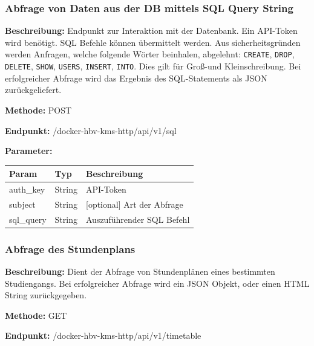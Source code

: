 \subsubsection{Abfrage von Daten aus der DB mittels SQL Query String}
\label{sec:api-sql-query}
\textbf{Beschreibung:} Endpunkt zur Interaktion mit der Datenbank. Ein API-Token wird benötigt. SQL Befehle können
übermittelt werden. Aus sicherheitsgründen werden Anfragen, welche folgende Wörter beinhalen, abgelehnt:
\verb|CREATE|, \verb|DROP|, \verb|DELETE|, \verb|SHOW|, \verb|USERS|, \verb|INSERT|, \verb|INTO|. Dies gilt für Groß-und Kleinschreibung. Bei erfolgreicher
Abfrage wird das Ergebnis des SQL-Statements als JSON zurückgeliefert.

\textbf{Methode:} POST

\textbf{Endpunkt:} /docker-hbv-kms-http/api/v1/sql

\textbf{Parameter:}
\begin{table}[H]
    \label{table:/docker-hbv-kms-http/api/v1/sql}
    \setlength{\tabcolsep}{3pt}
    \begin{tabular}{p{100pt}p{80pt}p{200pt}}
        \toprule
        Param      & Typ    & Beschreibung               \\
        \midrule
        auth\_key  & String & API-Token                  \\
        subject    & String & [optional] Art der Abfrage \\
        sql\_query & String & Auszuführender SQL Befehl  \\
        \bottomrule
    \end{tabular}
\end{table}
\dotfill

\subsubsection{Abfrage des Stundenplans}
\label{sec:api-timetable}
\textbf{Beschreibung:} Dient der Abfrage von Stundenplänen eines bestimmten Studiengangs.
Bei erfolgreicher Abfrage wird ein JSON Objekt, oder einen HTML String zurückgegeben.

\textbf{Methode:} GET

\textbf{Endpunkt:} /docker-hbv-kms-http/api/v1/timetable

